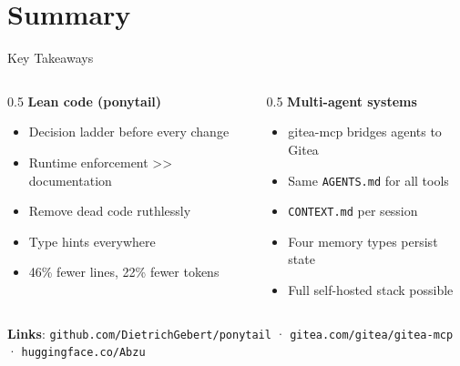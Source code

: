 \documentclass[
  ignorenonframetext,
  aspectratio=169,
]{beamer}
\providecommand{\tightlist}{%
  \setlength{\itemsep}{0pt}\setlength{\parskip}{0pt}}
\begin{document}
\section{Summary}\label{summary}

\begin{frame}[fragile]{Key Takeaways}
\label{key-takeaways}
\begin{columns}[T]
\begin{column}{0.5\textwidth}
\textbf{Lean code (ponytail)}

\begin{itemize}
\tightlist
\item
  Decision ladder before every change
\item
  Runtime enforcement \textgreater\textgreater{} documentation
\item
  Remove dead code ruthlessly
\item
  Type hints everywhere
\item
  46\% fewer lines, 22\% fewer tokens
\end{itemize}
\end{column}

\begin{column}{0.5\textwidth}
\textbf{Multi-agent systems}

\begin{itemize}
\tightlist
\item
  gitea-mcp bridges agents to Gitea
\item
  Same \texttt{AGENTS.md} for all tools
\item
  \texttt{CONTEXT.md} per session
\item
  Four memory types persist state
\item
  Full self-hosted stack possible
\end{itemize}
\end{column}
\end{columns}

\vspace{0.3em}

\textbf{Links}: \texttt{github.com/DietrichGebert/ponytail} ·
\texttt{gitea.com/gitea/gitea-mcp} · \texttt{huggingface.co/Abzu}
\end{frame}
\end{document}
